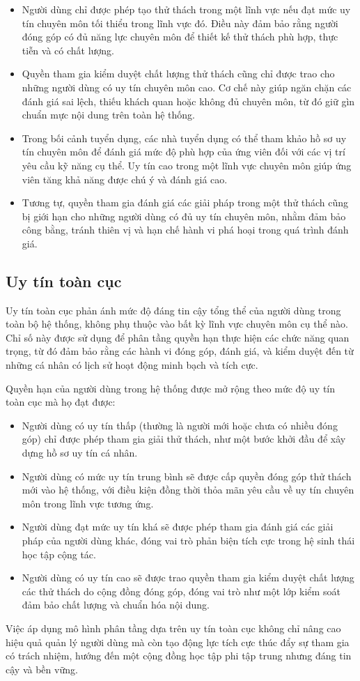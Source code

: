 \begin{itemize}
  \item Người dùng chỉ được phép tạo thử thách trong một lĩnh vực nếu đạt mức uy tín chuyên môn tối thiểu trong lĩnh vực đó. Điều này đảm bảo rằng người đóng góp có đủ năng lực chuyên môn để thiết kế thử thách phù hợp, thực tiễn và có chất lượng.
  \item Quyền tham gia kiểm duyệt chất lượng thử thách cũng chỉ được trao cho những người dùng có uy tín chuyên môn cao. Cơ chế này giúp ngăn chặn các đánh giá sai lệch, thiếu khách quan hoặc không đủ chuyên môn, từ đó giữ gìn chuẩn mực nội dung trên toàn hệ thống.
  \item Trong bối cảnh tuyển dụng, các nhà tuyển dụng có thể tham khảo hồ sơ uy tín chuyên môn để đánh giá mức độ phù hợp của ứng viên đối với các vị trí yêu cầu kỹ năng cụ thể. Uy tín cao trong một lĩnh vực chuyên môn giúp ứng viên tăng khả năng được chú ý và đánh giá cao.
  \item Tương tự, quyền tham gia đánh giá các giải pháp trong một thử thách cũng bị giới hạn cho những người dùng có đủ uy tín chuyên môn, nhằm đảm bảo công bằng, tránh thiên vị và hạn chế hành vi phá hoại trong quá trình đánh giá.
\end{itemize}

\subsection{Uy tín toàn cục}

Uy tín toàn cục phản ánh mức độ đáng tin cậy tổng thể của người dùng trong toàn bộ hệ thống, không phụ thuộc vào bất kỳ lĩnh vực chuyên môn cụ thể nào.
Chỉ số này được sử dụng để phân tầng quyền hạn thực hiện các chức năng quan trọng, từ đó đảm bảo rằng các hành vi đóng góp, đánh giá, và kiểm duyệt đến từ những cá nhân có lịch sử hoạt động minh bạch và tích cực.

Quyền hạn của người dùng trong hệ thống được mở rộng theo mức độ uy tín toàn cục mà họ đạt được:

\begin{itemize}
  \item Người dùng có uy tín thấp (thường là người mới hoặc chưa có nhiều đóng góp) chỉ được phép tham gia giải thử thách, như một bước khởi đầu để xây dựng hồ sơ uy tín cá nhân.
  \item Người dùng có mức uy tín trung bình sẽ được cấp quyền đóng góp thử thách mới vào hệ thống, với điều kiện đồng thời thỏa mãn yêu cầu về uy tín chuyên môn trong lĩnh vực tương ứng.
  \item Người dùng đạt mức uy tín khá sẽ được phép tham gia đánh giá các giải pháp của người dùng khác, đóng vai trò phản biện tích cực trong hệ sinh thái học tập cộng tác.
  \item Người dùng có uy tín cao sẽ được trao quyền tham gia kiểm duyệt chất lượng các thử thách do cộng đồng đóng góp, đóng vai trò như một lớp kiểm soát đảm bảo chất lượng và chuẩn hóa nội dung.
\end{itemize}

Việc áp dụng mô hình phân tầng dựa trên uy tín toàn cục không chỉ nâng cao hiệu quả quản lý người dùng mà còn tạo động lực tích cực thúc đẩy sự tham gia có trách nhiệm, hướng đến một cộng đồng học tập phi tập trung nhưng đáng tin cậy và bền vững.